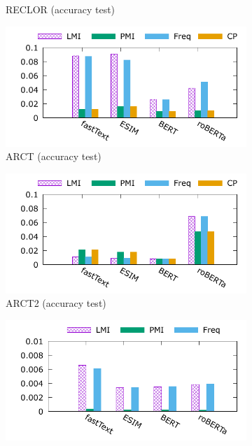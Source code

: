 \begin{figure}[th]
\begin{subfigure}[b]{0.24\textwidth}
\caption{RECLOR (accuracy test)}
\label{fig:cue_reclor}
\end{subfigure}
\hfill
\begin{subfigure}[b]{0.24\textwidth}
\centering
\includegraphics[width=\columnwidth]{data/acc_arct.pdf}
\caption{ARCT (accuracy test)}
\label{fig:cue_arct}
\end{subfigure}
\hfill
\begin{subfigure}[b]{0.24\textwidth}
\centering
\includegraphics[width=\columnwidth]{data/acc_arct2.pdf}
\caption{ARCT2 (accuracy test)}
\label{fig:cue_arct2}
\end{subfigure}
\newpage
\begin{subfigure}[b]{0.24\textwidth}
\centering
\includegraphics[width=\columnwidth]{data/dist_snli.pdf}

\end{subfigure}
\end{figure}

